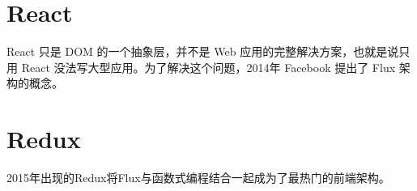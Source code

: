 \chapter{React}


React 只是 DOM 的一个抽象层，并不是 Web 应用的完整解决方案，也就是说只用 React 没法写大型应用。为了解决这个问题，2014年 Facebook 提出了 Flux 架构的概念。




\chapter{Redux}


2015年出现的Redux将Flux与函数式编程结合一起成为了最热门的前端架构。


